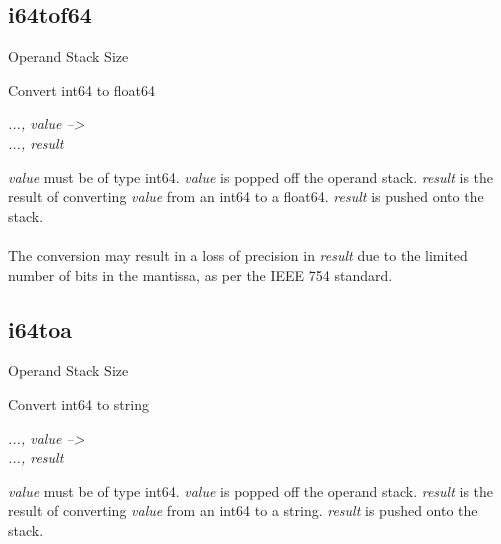 \documentclass[12pt]{article}
\begin{document}
		\subsection*{i64tof64}
			\begin{labeling}{Operand Stack Size}
				\item [\textbf{Operation}] Convert int64 to float64
				\item [\textbf{Format}] 
				\item [\textbf{Operand Stack}] \textit{..., value --\textgreater} \\
										\textit{..., result}
				\item [\textbf{Description}] \textit{value} must be of type int64. \textit{value} is popped off the operand stack. \textit{result} is the result of converting \textit{value} from an int64 to a float64. \textit{result} is pushed onto the stack. \\ \\
				The conversion may result in a loss of precision in \textit{result} due to the limited number of bits in the mantissa, as per the IEEE 754 standard. 
			\end{labeling}	
		\newpage
		
		\subsection*{i64toa}
			\begin{labeling}{Operand Stack Size}
				\item [\textbf{Operation}] Convert int64 to string
				\item [\textbf{Format}] 
				\item [\textbf{Operand Stack}] \textit{..., value --\textgreater} \\
										\textit{..., result}
				\item [\textbf{Description}] \textit{value} must be of type int64. \textit{value} is popped off the operand stack. \textit{result} is the result of converting \textit{value} from an int64 to a string. \textit{result} is pushed onto the stack. \\ \\
			\end{labeling}	
		\newpage
		
\end{document}
